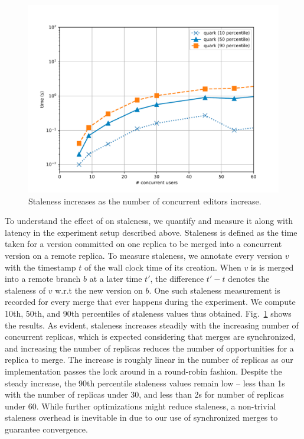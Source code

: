 \begin{figure}[ht]
  \centering
    \includegraphics[scale=0.4]{Figures/monkey_staleness}
\caption{Staleness increases as the number of concurrent editors
  increase.}
\label{fig:monkey-staleness}
\vspace*{-0.2in}
\end{figure}

To understand the effect of \quark on
staleness, we quantify and measure it along with latency in the
experiment setup described above. Staleness is defined as the time
taken for a version committed on one replica to be merged into a
concurrent version on a remote replica. To measure staleness, we
annotate every version $v$ with the timestamp $t$ of the wall clock
time of its creation. When $v$ is is merged into a remote branch $b$
at a later time $t'$, the difference $t' - t$ denotes the staleness of
$v$ w.r.t the new version on $b$. One such staleness measurement is
recorded for every merge that ever happens during the experiment. We
compute 10th, 50th, and 90th percentiles of staleness values thus
obtained. Fig.~\ref{fig:monkey-staleness} shows the results. As
evident, staleness increases steadily with the increasing number of
concurrent replicas, which is expected considering that merges are
synchronized, and increasing the number of replicas reduces the number
of opportunities for a replica to merge. The increase is roughly
linear in the number of replicas as our implementation passes the lock
around in a round-robin fashion. Despite the steady increase, the 90th
percentile staleness values remain low -- less than 1s with the
number of replicas under 30, and less than 2s for number of replicas
under 60. While further optimizations might reduce staleness, a
non-trivial staleness overhead is inevitable in \quark due to our use
of synchronized merges to guarantee convergence. 

